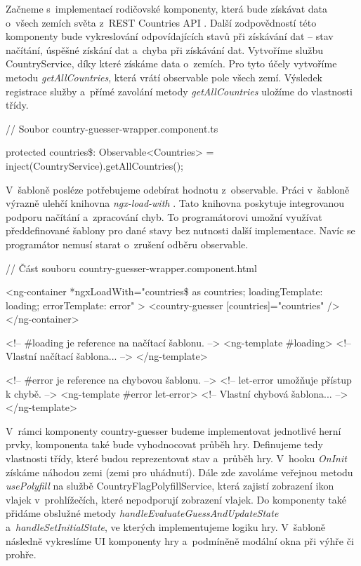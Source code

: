 Začneme s~implementací rodičovské komponenty, která bude získávat data o~všech zemích světa z~REST Countries API \cite{restcountriesapi}. 
Další zodpovědností této komponenty bude vykreslování odpovídajících stavů při získávání dat -- stav načítání, úspěšné získání dat a~chyba při získávání dat. 
Vytvoříme službu CountryService, díky které získáme data o~zemích. Pro tyto účely vytvoříme metodu \emph{getAllCountries}, která vrátí observable pole všech zemí. 
Výsledek registrace služby a~přímé zavolání metody \emph{getAllCountries} uložíme do vlastnosti třídy.

\begin{prog}
// Soubor country-guesser-wrapper.component.ts

protected countries\$: Observable<Countries> 
  = inject(CountryService).getAllCountries();
\end{prog}

V~šabloně posléze potřebujeme odebírat hodnotu z~observable. Práci v~šabloně výrazně ulehčí knihovna \emph{ngx-load-with} \cite{ngxloadwith}. 
Tato knihovna poskytuje integrovanou podporu načítání a~zpracování chyb. To programátorovi umožní využívat předdefinované šablony pro dané stavy bez nutnosti další implementace. 
Navíc se programátor nemusí starat o~zrušení odběru observable.

\begin{prog}
// Část souboru country-guesser-wrapper.component.html

<ng-container
  *ngxLoadWith="countries\$ as countries; 
  loadingTemplate: loading; errorTemplate: error"
>
  <country-guesser [countries]="countries" />
</ng-container>

<!-- \#loading je reference na načítací šablonu. -->
<ng-template \#loading>
  <!-- Vlastní načítací šablona... -->
</ng-template>

<!-- \#error je reference na chybovou šablonu. -->
<!-- let-error umožňuje přístup k chybě. -->
<ng-template \#error let-error>
  <!-- Vlastní chybová šablona... -->
</ng-template>
\end{prog}

V~rámci komponenty country-guesser budeme implementovat jednotlivé herní prvky, komponenta také bude vyhodnocovat průběh hry. 
Definujeme tedy vlastnosti třídy, které budou reprezentovat stav a~průběh hry. V~hooku \emph{OnInit} získáme náhodou zemi (zemi pro uhádnutí). 
Dále zde zavoláme veřejnou metodu \emph{usePolyfill} na službě CountryFlagPolyfillService, která zajistí zobrazení ikon vlajek v~prohlížečích, které nepodporují zobrazení vlajek.
Do komponenty také přidáme obslužné metody \emph{handleEvaluateGuessAndUpdateState} a~\emph{handleSetInitialState}, ve kterých implementujeme logiku hry. 
V~šabloně následně vykreslíme UI komponenty hry a~podmíněně modální okna při výhře či prohře.

